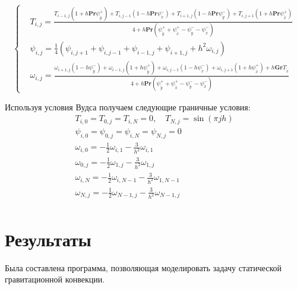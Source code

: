 \documentclass[a4paper, 12pt]{article}
\newcommand{\Pra}{\mathbf{Pr}}
\newcommand{\Gra}{\mathbf{Gr}}
\newcommand{\psp}[2]{\psi_{\mathring{#1}}^{#2}}
\begin{document}
    \begin{equation}
      \left\{
        \begin{aligned}
          &T_{i,j} =
            \frac{
              T_{i-1,j}\left(
                1 + h \Pra \psp{y}{+}
              \right) +
              T_{i,j-1}\left(
                1 - h \Pra \psp{x}{-}
              \right) +
              T_{i+1,j}\left(
                1 - h \Pra \psp{y}{-}
              \right) +
              T_{i,j+1}\left(
                1 + h \Pra \psp{x}{+}
              \right)
            }{4 + h \Pra \left(
              \psp{y}{+} + \psp{x}{+} - \psp{y}{-} - \psp{x}{-}
            \right)}
          \\
          &\psi_{i,j} = \frac{1}{4} \left(
            \psi_{i,j+1} + \psi_{i,j-1} + \psi_{i-1,j} + \psi_{i+1,j} +
            h^2 \omega_{i,j}
          \right)
          \\
          &\omega_{i,j} =
            \frac{
              \omega_{i+1, j} \left( 1 - h \psp{y}{-} \right) +
              \omega_{i-1, j} \left( 1 + h \psp{y}{+} \right) +
              \omega_{i, j-1} \left( 1 - h \psp{x}{-} \right) +
              \omega_{i, j+1} \left( 1 + h \psp{x}{+} \right) +
              h \Gra T_{\mathring{x}}
            }{4 + h \Pra \left(
              \psp{y}{+} + \psp{x}{+} - \psp{y}{-} - \psp{x}{-}
            \right)}
        \end{aligned}
      \right.
    \end{equation}

    Используя условия Вудса получаем следующие граничные условия:
    \begin{gather*}
      T_{i,0} = T_{0,j} = T_{i,N} = 0, \quad T_{N,j} = \sin (\pi j h)
      \\
      \psi_{i,0} = \psi_{0,j} = \psi_{i,N} = \psi_{N,j} = 0
      \\
      \omega_{i,0} = - \frac{1}{2} \omega_{i,1} - \frac{3}{h^2} \omega_{i,1}
      \\
      \omega_{0,j} = - \frac{1}{2} \omega_{1,j} - \frac{3}{h^2} \omega_{1,j}
      \\
      \omega_{i,N} = - \frac{1}{2} \omega_{i,N-1} - \frac{3}{h^2} \omega_{1,N-1}
      \\
      \omega_{N,j} = - \frac{1}{2} \omega_{N-1,j} - \frac{3}{h^2} \omega_{N-1,j}
      \\
    \end{gather*}
  \pagebreak

  \section{Результаты}
    Была составлена программа, позволяющая моделировать задачу статической
    гравитационной конвекции.
\end{document}
